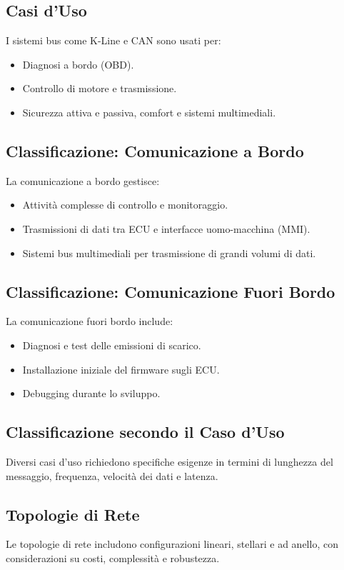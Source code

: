 \subsection{Casi d'Uso}
I sistemi bus come K-Line e CAN sono usati per:
\begin{itemize}
    \item Diagnosi a bordo (OBD).
    \item Controllo di motore e trasmissione.
    \item Sicurezza attiva e passiva, comfort e sistemi multimediali.
\end{itemize}

\subsection{Classificazione: Comunicazione a Bordo}
La comunicazione a bordo gestisce:
\begin{itemize}
    \item Attività complesse di controllo e monitoraggio.
    \item Trasmissioni di dati tra ECU e interfacce uomo-macchina (MMI).
    \item Sistemi bus multimediali per trasmissione di grandi volumi di dati.
\end{itemize}

\subsection{Classificazione: Comunicazione Fuori Bordo}
La comunicazione fuori bordo include:
\begin{itemize}
    \item Diagnosi e test delle emissioni di scarico.
    \item Installazione iniziale del firmware sugli ECU.
    \item Debugging durante lo sviluppo.
\end{itemize}

\subsection{Classificazione secondo il Caso d'Uso}
Diversi casi d'uso richiedono specifiche esigenze in termini di lunghezza del messaggio, frequenza, velocità dei dati e latenza.

\subsection{Topologie di Rete}
Le topologie di rete includono configurazioni lineari, stellari e ad anello, con considerazioni su costi, complessità e robustezza.

